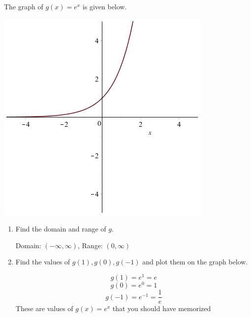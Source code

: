 \documentclass[handout]{ximera}
\begin{document}
\begin{problem}
\begin{enumerate}
\begin{freeResponse}
	\end{freeResponse}


	\end{enumerate}
	
	
	
	
\end{problem}

\begin{instructorNotes}

\end{instructorNotes}




\begin{problem}
The graph of $g(x)=e^x$ is given below.

	\begin{image}		
	\includegraphics{Figure1.jpg}
	\end{image}

\begin{enumerate}	
	\item  Find the domain and range of $g$.
		\begin{freeResponse}
		Domain: $(-\infty,\infty)$, Range: $(0,\infty)$
		\end{freeResponse}


	
	\item  Find the values of $g(1), g(0), g(-1)$ and plot them on the graph below.
		\begin{freeResponse}
	
			$$g(1)=e^1=e$$
			$$ g(0)=e^0=1$$ 
			$$g(-1)=e^{-1}=\frac{1}{e}$$
			 These are values of $g(x)=e^x$ that you should have memorized


\end{freeResponse}
\end{enumerate}
\end{problem}
\end{document}
